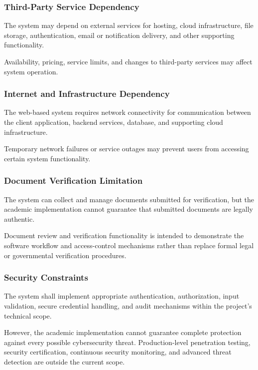 \subsubsection{Third-Party Service Dependency}

The system may depend on external services for hosting, cloud
infrastructure, file storage, authentication, email or notification
delivery, and other supporting functionality.

Availability, pricing, service limits, and changes to third-party
services may affect system operation.

\subsubsection{Internet and Infrastructure Dependency}

The web-based system requires network connectivity for communication
between the client application, backend services, database, and
supporting cloud infrastructure.

Temporary network failures or service outages may prevent users from
accessing certain system functionality.

\subsubsection{Document Verification Limitation}

The system can collect and manage documents submitted for verification,
but the academic implementation cannot guarantee that submitted
documents are legally authentic.

Document review and verification functionality is intended to
demonstrate the software workflow and access-control mechanisms rather
than replace formal legal or governmental verification procedures.

\subsubsection{Security Constraints}

The system shall implement appropriate authentication, authorization,
input validation, secure credential handling, and audit mechanisms
within the project's technical scope.

However, the academic implementation cannot guarantee complete
protection against every possible cybersecurity threat. Production-level
penetration testing, security certification, continuous security
monitoring, and advanced threat detection are outside the current
scope.

